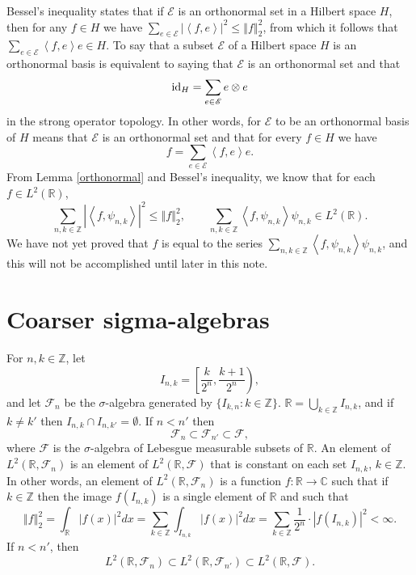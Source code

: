 \documentclass{article}
\newcommand{\inner}[2]{\left\langle #1, #2 \right\rangle}
\newcommand{\id}{\ensuremath\mathrm{id}}
\newcommand{\norm}[1]{\left\Vert #1 \right\Vert}
\theoremstyle{definition}
\theoremstyle{definition}
\begin{document}
Bessel's inequality states that if $\mathscr{E}$ is an orthonormal set in a Hilbert space $H$, then for any $f \in H$ we have
  $\sum_{e \in \mathscr{E}} |\inner{f}{e}|^2 \leq \norm{f}_2^2$, from which it follows that $\sum_{e \in \mathscr{E}} \inner{f}{e}e \in H$.
To say that a subset $\mathscr{E}$ of a Hilbert space $H$ is  an orthonormal basis is equivalent to saying that $\mathscr{E}$ is
an orthonormal set and that
\[
\id_H = \sum_{e \in \mathscr{E}} e \otimes e
\]
in the strong operator topology. In other words, for $\mathscr{E}$ to be an orthonormal basis of $H$ means that $\mathscr{E}$
is an orthonormal set and that for every
$f \in H$ we have
\[
f = \sum_{e \in \mathscr{E}} \inner{f}{e}e.
\]
From Lemma \ref{orthonormal}  and Bessel's inequality, we know that for each $f \in L^2(\mathbb{R})$,
\[
\sum_{n,k \in \mathbb{Z}} |\inner{f}{\psi_{n,k}}|^2 \leq \norm{f}_2^2, \qquad
\sum_{n,k \in \mathbb{Z}} \inner{f}{\psi_{n,k}} \psi_{n,k} \in L^2(\mathbb{R}).
\]
We have not yet  proved that $f$ is equal to the series $\sum_{n,k \in \mathbb{Z}} \inner{f}{\psi_{n,k}} \psi_{n,k}$, and this will not be accomplished until later
in this note.




\section{Coarser sigma-algebras}
For $n,k \in \mathbb{Z}$, let
\[
I_{n,k} = \left[ \frac{k}{2^n}, \frac{k+1}{2^n} \right),
\]
and let $\mathscr{F}_n$ be the $\sigma$-algebra generated by $\{I_{k,n}: k \in \mathbb{Z}\}$. 
$\mathbb{R} = \bigcup_{k \in \mathbb{Z}} I_{n,k}$, and if $k \neq k'$ then $I_{n,k} \cap I_{n,k'} = \emptyset$.
 If $n < n'$ then
\[
\mathscr{F}_n \subset \mathscr{F}_{n'} \subset \mathscr{F},
\]
where $\mathscr{F}$ is the $\sigma$-algebra of Lebesgue measurable subsets of $\mathbb{R}$.
An element  of $L^2(\mathbb{R},\mathscr{F}_n)$ is an element of $L^2(\mathbb{R},\mathscr{F})$ that is constant on each set $I_{n,k}$, $k \in \mathbb{Z}$. In other words, an element
of $L^2(\mathbb{R},\mathscr{F}_n)$ is a function $f:\mathbb{R} \to \mathbb{C}$
such that if $k \in \mathbb{Z}$ then the image $f(I_{n,k})$ is a single element of $\mathbb{R}$ and such that
\[
\norm{f}_2^2=\int_{\mathbb{R}} |f(x)|^2 dx =\sum_{k \in \mathbb{Z}} \int_{I_{n,k}} |f(x)|^2 dx= \sum_{k \in \mathbb{Z}}  \frac{1}{2^n} \cdot |f(I_{n,k})|^2 < \infty.
\]
If $n<n'$, then
\[
L^2(\mathbb{R},\mathscr{F}_n) \subset L^2(\mathbb{R},\mathscr{F}_{n'}) \subset L^2(\mathbb{R},\mathscr{F}).
\]
\end{document}
